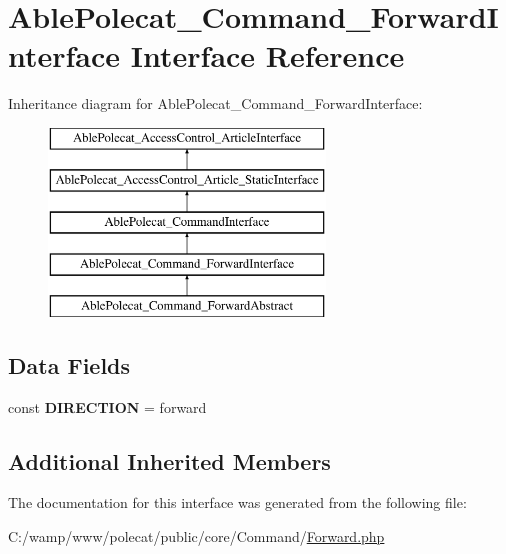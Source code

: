\hypertarget{interface_able_polecat___command___forward_interface}{}\section{Able\+Polecat\+\_\+\+Command\+\_\+\+Forward\+Interface Interface Reference}
\label{interface_able_polecat___command___forward_interface}
Inheritance diagram for Able\+Polecat\+\_\+\+Command\+\_\+\+Forward\+Interface\+:\begin{figure}[H]
\begin{center}
\leavevmode
\includegraphics[height=5.000000cm]{interface_able_polecat___command___forward_interface}
\end{center}
\end{figure}
\subsection*{Data Fields}
\begin{DoxyCompactItemize}
\item 
\hypertarget{interface_able_polecat___command___forward_interface_ad3beabcf9bd583f082d33e2971b96b3d}{}const {\bfseries D\+I\+R\+E\+C\+T\+I\+O\+N} = \textquotesingle{}forward\textquotesingle{}\label{interface_able_polecat___command___forward_interface_ad3beabcf9bd583f082d33e2971b96b3d}

\end{DoxyCompactItemize}
\subsection*{Additional Inherited Members}


The documentation for this interface was generated from the following file\+:\begin{DoxyCompactItemize}
\item 
C\+:/wamp/www/polecat/public/core/\+Command/\hyperlink{_forward_8php}{Forward.\+php}\end{DoxyCompactItemize}
